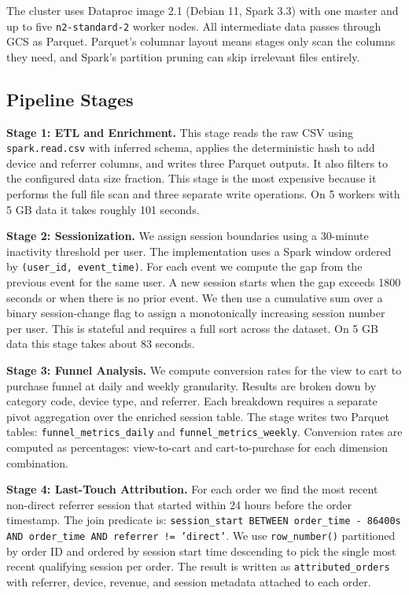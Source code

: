 \documentclass[letterpaper,twocolumn,10pt]{article}
\begin{document}
The cluster uses Dataproc image 2.1 (Debian 11, Spark 3.3) with one master and up
to five \texttt{n2-standard-2} worker nodes. All intermediate data passes through
GCS as Parquet. Parquet's columnar layout means stages only scan the columns they
need, and Spark's partition pruning can skip irrelevant files entirely.

\subsection{Pipeline Stages}

\textbf{Stage 1: ETL and Enrichment.}
This stage reads the raw CSV using \texttt{spark.read.csv} with inferred schema,
applies the deterministic hash to add device and referrer columns, and writes three
Parquet outputs. It also filters to the configured data size fraction. This stage is
the most expensive because it performs the full file scan and three separate write
operations. On 5 workers with 5 GB data it takes roughly 101 seconds.

\textbf{Stage 2: Sessionization.}
We assign session boundaries using a 30-minute inactivity threshold per user. The
implementation uses a Spark window ordered by \texttt{(user\_id, event\_time)}.
For each event we compute the gap from the previous event for the same user. A new
session starts when the gap exceeds 1800 seconds or when there is no prior event.
We then use a cumulative sum over a binary session-change flag to assign a
monotonically increasing session number per user. This is stateful and requires a
full sort across the dataset. On 5 GB data this stage takes about 83 seconds.

\textbf{Stage 3: Funnel Analysis.}
We compute conversion rates for the view to cart to purchase funnel at daily and
weekly granularity. Results are broken down by category code, device type, and
referrer. Each breakdown requires a separate pivot aggregation over the enriched
session table. The stage writes two Parquet tables: \texttt{funnel\_metrics\_daily}
and \texttt{funnel\_metrics\_weekly}. Conversion rates are computed as percentages:
view-to-cart and cart-to-purchase for each dimension combination.

\textbf{Stage 4: Last-Touch Attribution.}
For each order we find the most recent non-direct referrer session that started
within 24 hours before the order timestamp. The join predicate is:
\texttt{session\_start BETWEEN order\_time - 86400s AND order\_time AND referrer != 'direct'}.
We use \texttt{row\_number()} partitioned by order ID and ordered by session start
time descending to pick the single most recent qualifying session per order. The
result is written as \texttt{attributed\_orders} with referrer, device, revenue,
and session metadata attached to each order.
\end{document}
